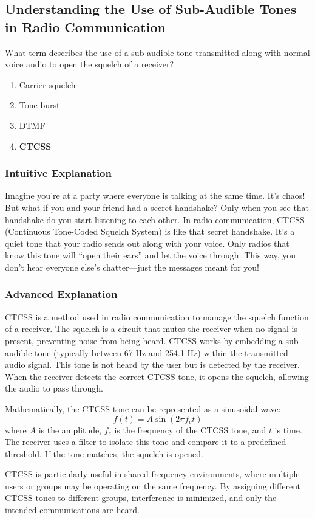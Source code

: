 \subsection{Understanding the Use of Sub-Audible Tones in Radio Communication}\label{T2B02}

\begin{tcolorbox}[colback=gray!10!white,colframe=black!75!black,title=T2B02]
What term describes the use of a sub-audible tone transmitted along with normal voice audio to open the squelch of a receiver?
\begin{enumerate}[label=\Alph*]
    \item Carrier squelch
    \item Tone burst
    \item DTMF
    \item \textbf{CTCSS}
\end{enumerate}
\end{tcolorbox}

\subsubsection{Intuitive Explanation}
Imagine you’re at a party where everyone is talking at the same time. It’s chaos! But what if you and your friend had a secret handshake? Only when you see that handshake do you start listening to each other. In radio communication, CTCSS (Continuous Tone-Coded Squelch System) is like that secret handshake. It’s a quiet tone that your radio sends out along with your voice. Only radios that know this tone will “open their ears” and let the voice through. This way, you don’t hear everyone else’s chatter—just the messages meant for you!

\subsubsection{Advanced Explanation}
CTCSS is a method used in radio communication to manage the squelch function of a receiver. The squelch is a circuit that mutes the receiver when no signal is present, preventing noise from being heard. CTCSS works by embedding a sub-audible tone (typically between 67 Hz and 254.1 Hz) within the transmitted audio signal. This tone is not heard by the user but is detected by the receiver. When the receiver detects the correct CTCSS tone, it opens the squelch, allowing the audio to pass through.

Mathematically, the CTCSS tone can be represented as a sinusoidal wave:
\[
f(t) = A \sin(2\pi f_c t)
\]
where \( A \) is the amplitude, \( f_c \) is the frequency of the CTCSS tone, and \( t \) is time. The receiver uses a filter to isolate this tone and compare it to a predefined threshold. If the tone matches, the squelch is opened.

CTCSS is particularly useful in shared frequency environments, where multiple users or groups may be operating on the same frequency. By assigning different CTCSS tones to different groups, interference is minimized, and only the intended communications are heard.

